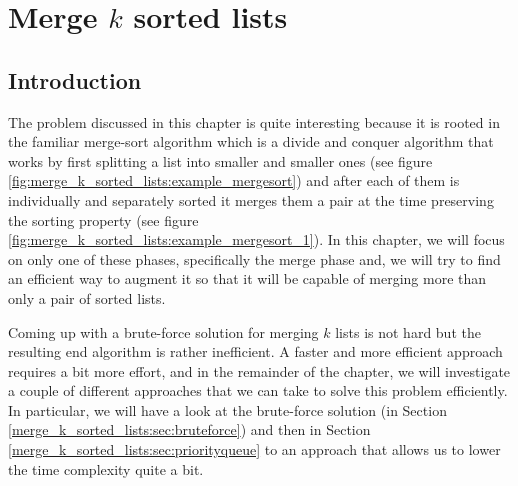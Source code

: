 %



\chapter{Merge $k$ sorted lists}
\label{ch:merge_k_sorted_lists}
\section*{Introduction}
The problem discussed in this chapter is quite interesting because it is rooted in the familiar merge-sort algorithm\cite{wiki:mergesort} which is a divide and conquer algorithm that works by first splitting a list into smaller and smaller ones (see figure \ref{fig:merge_k_sorted_lists:example_mergesort}) and after each of them is individually and separately sorted it merges them a pair at the time preserving the sorting property (see figure \ref{fig:merge_k_sorted_lists:example_mergesort_1}). 
In this chapter, we will focus on only one of these phases, specifically the merge phase and, we will try to find an efficient way to augment it so that it will be capable of merging more than only a pair of sorted lists. 

Coming up with a brute-force solution for merging $k$ lists is not hard but the resulting end algorithm is rather inefficient. 
A faster and more efficient approach requires a bit more effort, and in the remainder of the chapter, we will investigate a couple of different approaches that we can take to solve this problem efficiently.
In particular, we will have a look at the brute-force solution (in Section \ref{merge_k_sorted_lists:sec:bruteforce}) and then in Section \ref{merge_k_sorted_lists:sec:priorityqueue} to an approach that allows us to lower the time complexity quite a bit.


